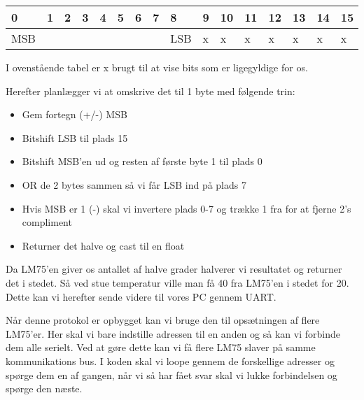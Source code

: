 \documentclass[../main.tex]{subfiles}
\begin{document}
\begin{table}[h]
    \centering
    \begin{tabular}{|llllllllllllllll|}
    \hline
    \multicolumn{1}{|l|}{0}   & \multicolumn{1}{l|}{1} & \multicolumn{1}{l|}{2}  & \multicolumn{1}{l|}{3}  & \multicolumn{1}{l|}{4}  & \multicolumn{1}{l|}{5}  & \multicolumn{1}{l|}{6}  & \multicolumn{1}{l|}{7}  & \multicolumn{1}{|l|}{8}   & \multicolumn{1}{l|}{9} & \multicolumn{1}{l|}{10} & \multicolumn{1}{l|}{11} & \multicolumn{1}{l|}{12} & \multicolumn{1}{l|}{13} & \multicolumn{1}{l|}{14} & \multicolumn{1}{l|}{15} \\ \hline
    MSB &                        &                         &                         &                         &                         &                         &                      & \multicolumn{1}{l|}{LSB} & \multicolumn{1}{l|}{x} & \multicolumn{1}{l|}{x}  & \multicolumn{1}{l|}{x}  & \multicolumn{1}{l|}{x}  & \multicolumn{1}{l|}{x}  & \multicolumn{1}{l|}{x}  & \multicolumn{1}{l|}{x}  \\ \hline    
    \end{tabular}
\end{table}
I ovenstående tabel er x brugt til at vise bits som er ligegyldige for os.

Herefter planlægger vi at omskrive det til 1 byte med følgende trin:
\begin{itemize}
    \item Gem fortegn (+/-) MSB
    \item Bitshift LSB til plads 15
    \item Bitshift MSB'en ud og resten af første byte 1 til plads 0
    \item OR de 2 bytes sammen så vi får LSB ind på plads 7
    \item Hvis MSB er 1 (-) skal vi invertere plads 0-7 og trække 1 fra for at fjerne 2's compliment
    \item Returner det halve og cast til en float
\end{itemize}
Da LM75'en giver os antallet af halve grader halverer vi resultatet og returner det i stedet. Så ved stue temperatur ville man få 40 fra LM75'en i stedet for 20.
Dette kan vi herefter sende videre til vores PC gennem UART.

Når denne protokol er opbygget kan vi bruge den til opsætningen af flere LM75'er. Her skal vi bare indstille adressen til en anden og så kan vi forbinde dem alle serielt.
Ved at gøre dette kan vi få flere LM75 slaver på samme kommunikations bus. I koden skal vi loope gennem de forskellige adresser og spørge dem en af gangen, når vi så har fået svar skal vi lukke forbindelsen og spørge den næste.
\end{document}
